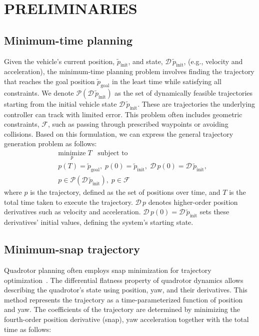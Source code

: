 \section{PRELIMINARIES}

\subsection{Minimum-time planning}

Given the vehicle's current position, $\tilde p_{\text{init}}$, and state, $\mathcal{D\,} \tilde p_{\text{init}}$, (e.g., velocity and acceleration), the minimum-time planning problem involves finding the trajectory that reaches the goal position $\tilde p_{\text{goal}}$ in the least time while satisfying all constraints.
We denote $\mathcal{P}(\mathcal{D\,} \tilde p_{\text{init}})$ as the set of dynamically feasible trajectories starting from the initial vehicle state $\mathcal{D\,} \tilde p_{\text{init}}$. 
These are trajectories the underlying controller can track with limited error.
This problem often includes geometric constraints, $\mathcal{F}$, such as passing through prescribed waypoints or avoiding collisions.
Based on this formulation, we can express the general trajectory generation problem as follows:
\begin{equation}
\begin{aligned}
&\underset{p}{\text{minimize}} \; T \;\;\; \text{subject to} \\
&p(T) = \tilde p_{\text{goal}},\; p(0) = \tilde p_{\text{init}},\; \mathcal{D\,} p(0) = \mathcal{D\,} \tilde p_{\text{init}}, \\
&p \in \mathcal{P}(\mathcal{D\,} \tilde p_{\text{init}}),\; p \in \mathcal{F}
\label{eqn:planning_general}
\end{aligned}
\end{equation}
where $p$ is the trajectory, defined as the set of positions over time, and $T$ is the total time taken to execute the trajectory.
$\mathcal{D\,} p$ denotes higher-order position derivatives such as velocity and acceleration. 
$\mathcal{D\,} p(0) = \mathcal{D\,} \tilde p_{\text{init}}$ sets these derivatives' initial values, defining the system's starting state.


\subsection{Minimum-snap trajectory}

Quadrotor planning often employs snap minimization for trajectory optimization~\cite{mellinger2011minimum, richter2016polynomial}.
The differential flatness property of quadrotor dynamics allows describing the quadrotor's state using position, yaw, and their derivatives. 
This method represents the trajectory as a time-parameterized function of position and yaw. 
The coefficients of the trajectory are determined by minimizing the fourth-order position derivative (snap), yaw acceleration together with the total time as follows:


